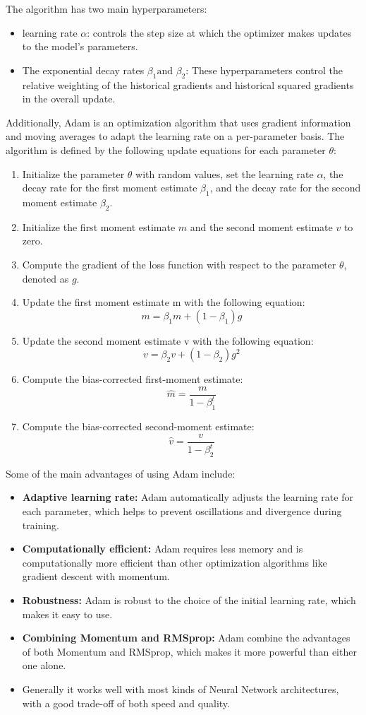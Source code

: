 \documentclass[a4paper]{article}
\begin{document}
The algorithm has two main hyperparameters:
\begin{itemize}[leftmargin=7.5pt]
    \item learning rate $\alpha$: controls the step size at which the optimizer makes updates to the model's parameters.
    \item The exponential decay rates $\beta_1 \text{and } \beta_2$: These hyperparameters control the relative weighting of the historical gradients and historical squared gradients in the overall update.
\end{itemize}

Additionally, Adam is an optimization algorithm that uses gradient information and moving averages to adapt the learning rate on a per-parameter basis. The algorithm is defined by the following update equations for each parameter $\theta$:
\begin{enumerate}[leftmargin=7.5pt]
    \item Initialize the parameter $\theta$ with random values, set the learning rate $\alpha$, the decay rate for the first moment estimate $\beta_1$, and the decay rate for the second moment estimate $\beta_2$.
    \item Initialize the first moment estimate $m$ and the second moment estimate $v$ to zero.
    \item Compute the gradient of the loss function with respect to the parameter $\theta$, denoted as $g$.
    \item Update the first moment estimate m with the following equation:
$$    
m = \beta_1 m + (1-\beta_1) g
$$
    \item Update the second moment estimate v with the following equation:
$$
v = \beta_2 v + (1-\beta_2) g^2
$$
    \item Compute the bias-corrected first-moment estimate:
$$\hat{m} = \frac{m}{1-\beta_1^t}$$
    \item Compute the bias-corrected second-moment estimate:
$$\hat{v} = \frac{v}{1-\beta_2^t}$$
\end{enumerate}

Some of the main advantages of using Adam include:
\begin{itemize}[leftmargin=7.5pt]
    \item \textbf{Adaptive learning rate:} Adam automatically adjusts the learning rate for each parameter, which helps to prevent oscillations and divergence during training.
    \item \textbf{Computationally efficient:} Adam requires less memory and is computationally more efficient than other optimization algorithms like gradient descent with momentum.
    \item \textbf{Robustness:} Adam is robust to the choice of the initial learning rate, which makes it easy to use.
    \item \textbf{Combining Momentum and RMSprop:} Adam combine the advantages of both Momentum and RMSprop, which makes it more powerful than either one alone.
    \item Generally it works well with most kinds of Neural Network architectures, with a good trade-off of both speed and quality.
\end{itemize}
\end{document}
